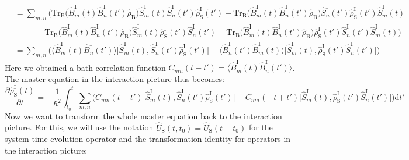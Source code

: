 \documentclass[9pt]{report}
\begin{document}
\begin{align}
&= \sum_{m,n}\Big(\mathrm{Tr}_{\mathrm{B}}\big(\hat{B}_{m}^{\mathrm{I}}(t)\hat{B}_{n}^{\mathrm{I}}(t')\hat{\rho}_{\mathrm{B}}\big)\hat{S}_{m}^{\mathrm{I}}(t)\hat{S}_{n}^{\mathrm{I}}(t')\hat{\rho}_{\mathrm{S}}^{\mathrm{I}}(t') - \mathrm{Tr}_{\mathrm{B}}\big(\hat{B}_{m}^{\mathrm{I}}(t)\hat{B}_{n}^{\mathrm{I}}(t')\hat{\rho}_{\mathrm{B}}\big)\hat{S}_{n}^{\mathrm{I}}(t')\hat{\rho}_{\mathrm{S}}^{\mathrm{I}}(t')\hat{S}_{m}^{\mathrm{I}}(t)\\
&\quad\quad\;\, -\mathrm{Tr}_{\mathrm{B}}\big(\hat{B}_{m}^{\mathrm{I}}(t)\hat{B}_{n}^{\mathrm{I}}(t')\hat{\rho}_{\mathrm{B}}\big)\hat{S}_{m}^{\mathrm{I}}(t)\hat{\rho}_{\mathrm{S}}^{\mathrm{I}}(t')\hat{S}_{n}^{\mathrm{I}}(t') +\mathrm{Tr}_{\mathrm{B}}\big(\hat{B}_{m}^{\mathrm{I}}(t)\hat{B}_{n}^{\mathrm{I}}(t')\hat{\rho}_{\mathrm{B}}\big)\hat{\rho}_{\mathrm{S}}^{\mathrm{I}}(t')\hat{S}_{n}^{\mathrm{I}}(t')\hat{S}_{m}^{\mathrm{I}}(t)\Big)\\
&= \sum_{m,n}\Big(\big\langle\hat{B}_{m}^{\mathrm{I}}(t)\hat{B}_{n}^{\mathrm{I}}(t')\big\rangle\big[\hat{S}_{m}^{\mathrm{I}}(t),\hat{S}_{n}^{\mathrm{I}}(t')\hat{\rho}_{\mathrm{S}}^{\mathrm{I}}(t')\big]-\big\langle\hat{B}_{n}^{\mathrm{I}}(t')\hat{B}_{m}^{\mathrm{I}}(t)\big\rangle\big[\hat{S}_{m}^{\mathrm{I}}(t),\hat{\rho}_{\mathrm{S}}^{\mathrm{I}}(t')\hat{S}_{n}^{\mathrm{I}}(t')\big]\Big)
\end{align}
Here we obtained a bath correlation function $C_{mn}(t-t')=\big\langle\hat{B}_{m}^{\mathrm{I}}(t)\hat{B}_{n}^{\mathrm{I}}(t')\big\rangle$. The master equation in the interaction picture thus becomes:
\begin{equation}
\frac{\partial\hat{\rho}_{\mathrm{S}}^{\mathrm{I}}(t)}{\partial t}=-\frac{1}{\hbar^2}\int_{t_0}^{t}\sum_{m,n}\Big(C_{mn}(t-t')\big[\hat{S}_{m}^{\mathrm{I}}(t),\hat{S}_{n}^{\mathrm{I}}(t')\hat{\rho}_{\mathrm{S}}^{\mathrm{I}}(t')\big]-C_{nm}(-t+t')\big[\hat{S}_{m}^{\mathrm{I}}(t),\hat{\rho}_{\mathrm{S}}^{\mathrm{I}}(t')\hat{S}_{n}^{\mathrm{I}}(t')\big]\Big)\mathrm{d}t'\label{Second_Born_Master_Equation}
\end{equation}
Now we want to transform the whole master equation back to the interaction picture. For this, we will use the notation $\hat{U}_{\mathrm{S}}(t,t_0)=\hat{U}_{\mathrm{S}}(t-t_0)$ for the system time evolution operator and the transformation identity for operators in the interaction picture:
\end{document}
